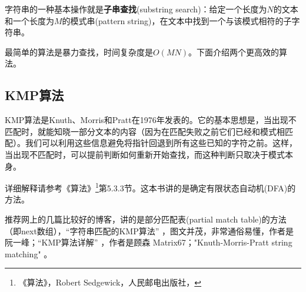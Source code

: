 字符串的一种基本操作就是\textbf{子串查找}(substring 
search)：给定一个长度为$N$的文本和一个长度为$M$的模式串(pattern 
string)，在文本中找到一个与该模式相符的子字符串。

最简单的算法是暴力查找，时间复杂度是$O(MN)$。下面介绍两个更高效的算法。


\subsection{KMP算法}
KMP算法是Knuth、Morris和Pratt在1976年发表的。它的基本思想是，当出现不匹配时，就能知晓一部分文本的内容（因为在匹配失败之前它们已经和模式相匹配）。我们可以利用这些信息避免将指针回退到所有这些已知的字符之前。这样，当出现不匹配时，可以提前判断如何重新开始查找，而这种判断只取决于模式本身。

详细解释请参考《算法》\footnote{《算法》，Robert 
Sedgewick，人民邮电出版社，}第5.3.3节。这本书讲的是确定有限状态自动机(DFA)的方法。

推荐网上的几篇比较好的博客，讲的是部分匹配表(partial match 
table)的方法（即next数组），“字符串匹配的KMP算法” 
，图文并茂，非常通俗易懂，作者是阮一峰；“KMP算法详解” 
，作者是顾森 
Matrix67；"Knuth-Morris-Pratt string matching" 
。

